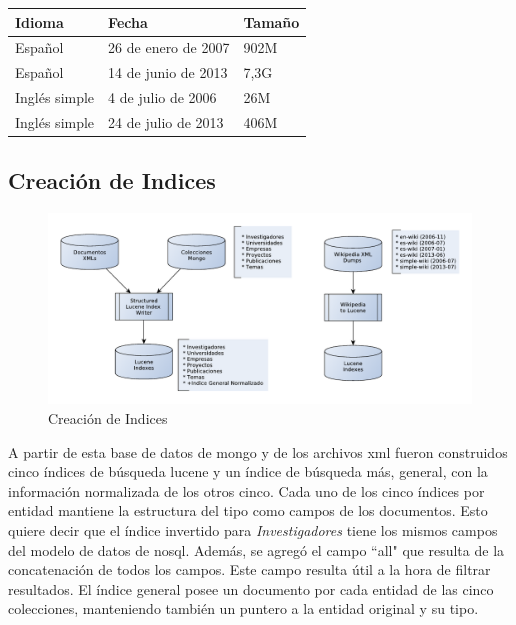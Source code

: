 \medskip

\begin{center}
\begin{tabular}{ | l | l | l |}
    \hline
    Idioma & Fecha & Tamaño\\ \hline
    Español & 26 de enero de 2007 & 902M \\ \hline
    Español & 14 de junio de 2013 & 7,3G \\ \hline
    Inglés simple & 4 de julio de 2006 & 26M \\ \hline
    Inglés simple & 24 de julio de 2013 & 406M \\ \hline
 \end{tabular}
\end{center}


\subsection{Creación de Indices}

\begin{figure}[H]
  \centering
    \includegraphics[scale=0.86]{graficos/LuceneWritersJuntos}
  \caption{Creación de Indices}
  \label{fig:LuceneIndexWriterBoth}
\end{figure}

A partir de esta base de datos de mongo y de los archivos xml fueron construidos cinco \'indices
de b\'usqueda lucene y un \'indice de b\'usqueda m\'as, general, con la
informaci\'on normalizada de los otros cinco. 
Cada uno de los cinco índices por entidad mantiene la estructura del tipo como campos de los documentos.
Esto quiere decir que el índice invertido para \emph{Investigadores} tiene los mismos campos
del modelo de datos de nosql. Además, se agregó el campo ``all" que resulta de la concatenación de
todos los campos. Este campo resulta útil a la hora de filtrar resultados. 
El índice general posee un documento por cada entidad de las cinco colecciones, 
manteniendo también un puntero a la entidad original y su tipo.

